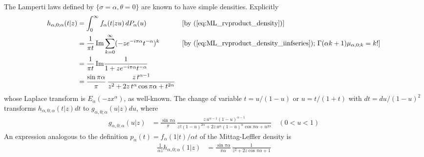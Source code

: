 \documentclass[a4paper,12pt]{article}
\begin{document}
{{The Lamperti laws defined by $\{\sigma=\alpha, \theta=0\}$ are known to have simple densities.
Explicitly
 \begin{alignat}{3}
 h_{\alpha,0; \alpha}(t \vert z)
 &=  \int_0^\infty  f_\alpha(t \vert z u) \, dP_{\alpha}(u)    \quad && [\textrm{by } (\ref{eq:ML_rvproduct_density})] \nonumber  \\
 &=  \frac{1}{\pi t}\,  {\rm Im} \sum_{k=0}^\infty  (-z e^{-i\pi\alpha} t^{-\alpha})^k  && [\textrm{by } (\ref{eq:ML_rvproduct_density_iinfseries});\,
                                       \Gamma(\alpha k+1)\mu_{\alpha,0;k} = k!] \nonumber  \\
 &= \frac{1}{\pi t}\,  {\rm Im} \frac{1}{1+z e^{-i\pi\alpha} t^{-\alpha}} \nonumber  \\
 &=  \frac{\sin\pi\alpha}{\pi}\, \frac{z\, t^{\alpha-1}} {z^2+2z \, t^\alpha \cos\pi\alpha+t^{2\alpha}} 
\label{eq:hPollard5} 
\end{alignat}
whose Laplace transform is  $E_\alpha(-z x^\alpha)$, as well-known.
The change of variable $t=u/(1-u)$ or $u=t/(1+t)$ with $dt=du/(1-u)^2$  transforms
 $h_{\alpha,0; \alpha}(t \vert z) dt$ to $ g_{\alpha,0; \alpha}(u \vert z) du$, where
 \begin{align}
 g_{\alpha,0; \alpha}(u \vert z)
 &=  \frac{\sin\pi\alpha}{\pi}\, \frac{z\, u^{\alpha-1}(1-u)^{\alpha-1}} {z^2(1-u)^{2\alpha}+2z \, u^\alpha (1-u)^\alpha \cos\pi\alpha+u^{2\alpha}} 
 \quad (0<u<1)
\label{eq:hPollard6} 
\end{align}
An expression analogous to  the definition $p_\alpha(t)=f_\alpha(1\vert t)/\alpha t$ of the Mittag-Leffler density  is 
 \begin{align}
\frac{1}{\alpha z} h_{\alpha,0; \alpha}(1 \vert z)
 &=  \frac{\sin\pi\alpha}{\pi\alpha}\, \frac{1} {z^2+2z \cos\pi\alpha+1} 
\label{eq:hPollard7} 
\end{align}

}}
\end{document}

